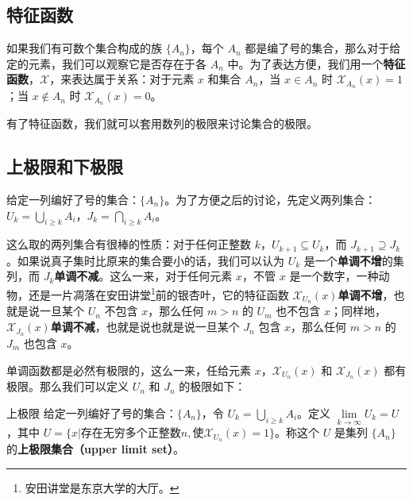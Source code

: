 



\subsection{特征函数}
如果我们有可数个集合构成的族 $\{A_n\}$，每个 $A_n$ 都是编了号的集合，那么对于给定的元素，我们可以观察它是否存在于各 $A_n$ 中。为了表达方便，我们用一个\textbf{特征函数}，$\mathcal{X}$，来表达属于关系：对于元素 $x$ 和集合 $A_n$，当 $x\in A_n$ 时 $\mathcal{X}_{A_n}(x)=1$；当 $x\not\in A_n$ 时 $\mathcal{X}_{A_n}(x)=0$。

有了特征函数，我们就可以套用数列的极限来讨论集合的极限。

\subsection{上极限和下极限}
给定一列编好了号的集合：$\{A_n\}$。为了方便之后的讨论，先定义两列集合：$U_k=\underset{i\ge k}{\bigcup}A_i$，$J_k=\underset{i\ge k}{\bigcap} A_i$。

这么取的两列集合有很棒的性质：对于任何正整数 $k$，$U_{k+1}\subseteq U_k$，而 $J_{k+1}\supseteq J_k$。如果说真子集时比原来的集合要小的话，我们可以认为 $U_k$ 是一个\textbf{单调不增}的集列，而 $J_k$\textbf{单调不减}。这么一来，对于任何元素 $x$，不管 $x$ 是一个数字，一种动物，还是一片凋落在安田讲堂\footnote{安田讲堂是东京大学的大厅。}前的银杏叶，它的特征函数 $\mathcal{X}_{U_n}(x)$\textbf{单调不增}，也就是说一旦某个 $U_n$ 不包含 $x$，那么任何 $m>n$ 的 $U_m$ 也不包含 $x$；同样地，$\mathcal{X}_{J_n}(x)$\textbf{单调不减}，也就是说也就是说一旦某个 $J_n$ 包含 $x$，那么任何 $m>n$ 的 $J_m$ 也包含 $x$。

单调函数都是必然有极限的，这么一来，任给元素 $x$，$\mathcal{X}_{U_n}(x)$ 和 $\mathcal{X}_{J_n}(x)$ 都有极限。那么我们可以定义 $U_n$ 和 $J_n$ 的极限如下：

\begin{definition}{上极限}\label{SetLim_def1}
给定一列编好了号的集合：$\{A_n\}$，令 $U_k=\underset{i\ge k}{\bigcup} A_i$。定义 $\lim\limits_{k\to\infty} U_k=U$，其中 $U=\{x|\text{存在无穷多个正整数}n,\text{使}\mathcal{X}_{U_n}(x)=1\}$。称这个 $U$ 是集列 $\{A_n\}$ 的\textbf{上极限集合（upper limit set）}。
\end{definition}

